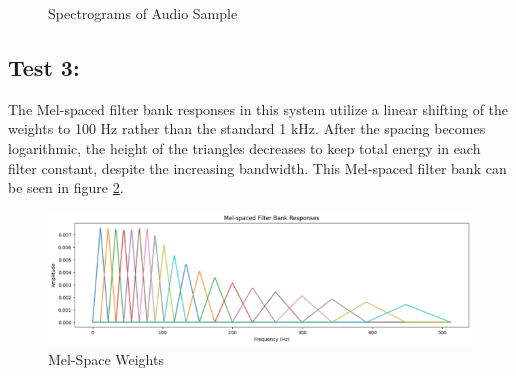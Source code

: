 \documentclass[conference]{IEEEtran}
\begin{document}
    \begin{figure}
        \centering
        \hfill
        \hfill
        \caption{Spectrograms of Audio Sample}
        \label{stft}
    \end{figure}

    \subsection*{Test 3:}
    The Mel-spaced filter bank responses in this system utilize a linear shifting of the weights to 100 Hz rather than the standard 1 kHz. After the spacing becomes logarithmic, the height of the triangles decreases to keep total energy in each filter constant, despite the increasing bandwidth. This Mel-spaced filter bank can be seen in figure \ref{weights}.

    \begin{figure}
        \centering
        \label{weights}
        \includegraphics[width=1\textwidth]{melweights.png}
        \caption{Mel-Space Weights}
    \end{figure}
\end{document}
